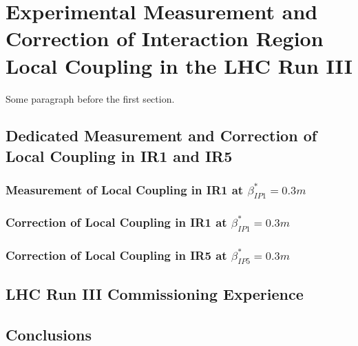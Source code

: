 
\chapter{Experimental Measurement and Correction of Interaction Region Local Coupling in the LHC Run III} %

\label{Chapter6} %




Some paragraph before the first section.


\section{Dedicated Measurement and Correction of Local Coupling in IR1 and IR5}

\subsection{Measurement of Local Coupling in IR1 at $\beta^{*}_{IP1} = 0.3m$}

\subsection{Correction of Local Coupling in IR1 at $\beta^{*}_{IP1} = 0.3m$}

\subsection{Correction of Local Coupling in IR5 at $\beta^{*}_{IP5} = 0.3m$}


\section{LHC Run III Commissioning Experience}


\section{Conclusions}

